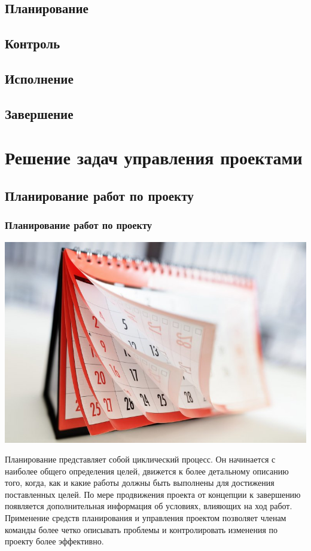 \documentclass{../industrial-development}
\begin{document}
    \subsection{Планирование}

    \subsection{Контроль}

    \subsection{Исполнение}

    \subsection{Завершение}

    \section{Решение задач управления проектами}

    \subsection{Планирование работ по проекту}

    \begin{frame} \frametitle{Планирование работ по проекту}
         \centerline{\includegraphics[width=1\textwidth]{planning.jpg}}
    \end{frame}
    \lecturenotes

Планирование представляет собой циклический процесс. Он начинается с наиболее общего определения целей, движется к более детальному описанию того, когда, как и какие работы должны быть выполнены для достижения поставленных целей. По мере продвижения проекта от концепции к завершению появляется дополнительная информация об условиях, влияющих на ход работ. Применение средств планирования и управления проектом позволяет членам команды более четко описывать проблемы и контролировать изменения по проекту более эффективно.
\end{document}
